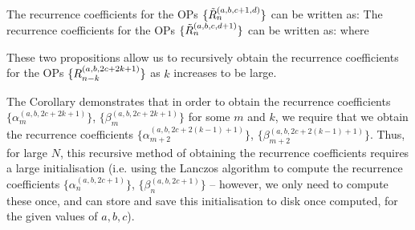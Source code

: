 \begin{corollary}
The recurrence coefficients for the OPs $\{\tilde{R}_n^{(a,b,c+1,d)}\}$ can be written as:
The recurrence coefficients for the OPs $\{\tilde{R}_n^{(a,b,c,d+1)}\}$ can be written as:
where 
\end{corollary}

These two propositions allow us to recursively obtain the recurrence coefficients for the OPs $\{R_{n-k}^{(a,b,2c+2k + 1)}\}$ as $k$ increases to be large. 

\remark The Corollary demonstrates that in order to obtain the recurrence coefficients $\{\alpha_{m}^{(a,b,2c+2k+1)}\}$, $\{\beta_{m}^{(a,b,2c+2k+1)}\}$ for some $m$ and $k$, we require that we obtain the recurrence coefficients $\{\alpha_{m+2}^{(a,b,2c+2(k-1)+1)}\}$, $\{\beta_{m+2}^{(a,b,2c+2(k-1)+1)}\}$. Thus, for large $N$, this recursive method of obtaining the recurrence coefficients requires a large initialisation (i.e. using the Lanczos algorithm to compute the recurrence coefficients $\{\alpha_{n}^{(a,b,2c+1)}\}$, $\{\beta_{n}^{(a,b,2c+1)}\}$ -- however, we only need to compute these once, and can store and save this initialisation to disk once computed, for the given values of $a, b, c$). 



